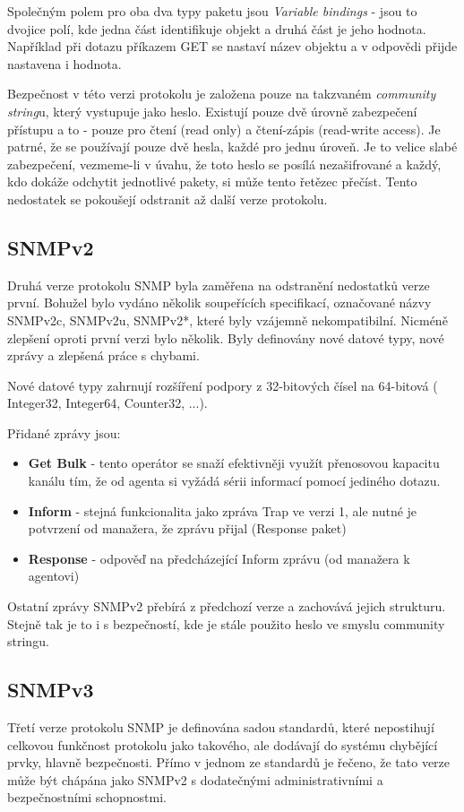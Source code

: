 Společným polem pro oba dva typy paketu jsou \textit{Variable bindings} - jsou to dvojice polí, kde jedna část identifikuje objekt a druhá část je jeho hodnota. Například
při dotazu příkazem GET se nastaví název objektu a v odpovědi přijde nastavena i hodnota.

Bezpečnost v této verzi protokolu je založena pouze na takzvaném \textit{community string}u, který vystupuje jako heslo. Existují pouze dvě úrovně zabezpečení
přístupu a to - pouze pro čtení (read only) a čtení-zápis (read-write access). Je patrné, že se používají pouze dvě hesla, každé pro jednu úroveň. Je to velice slabé
zabezpečení, vezmeme-li v úvahu, že toto heslo se posílá nezašifrované a každý, kdo dokáže odchytit jednotlivé pakety, si může tento řetězec přečíst. Tento nedostatek
se pokoušejí odstranit až další verze protokolu.

\subsection*{SNMPv2}
Druhá verze protokolu SNMP byla zaměřena na odstranění nedostatků verze první. Bohužel bylo vydáno několik soupeřících specifikací, označované názvy SNMPv2c, SNMPv2u, SNMPv2*, které
byly vzájemně nekompatibilní. Nicméně zlepšení oproti první verzi bylo několik. Byly definovány nové datové typy, nové zprávy a zlepšená práce s chybami.

Nové datové typy zahrnují rozšíření podpory z 32-bitových čísel na 64-bitová ( Integer32, Integer64, Counter32, ...). 

Přidané zprávy jsou:
\begin{itemize}
	\item \textbf{Get Bulk} - tento operátor se snaží efektivněji využít přenosovou kapacitu kanálu tím, že od agenta si vyžádá sérii informací pomocí jediného dotazu.
	\item \textbf{Inform} - stejná funkcionalita jako zpráva Trap ve verzi 1, ale nutné je potvrzení od manažera, že zprávu přijal (Response paket)
	\item \textbf{Response} - odpověď na předcházející Inform zprávu (od manažera k agentovi)
\end{itemize}

Ostatní zprávy SNMPv2 přebírá z předchozí verze a zachovává jejich strukturu. Stejně tak je to i s bezpečností, kde je stále použito heslo ve smyslu community stringu.

\subsection*{SNMPv3}
Třetí verze protokolu SNMP je definována sadou standardů, které nepostihují celkovou funkčnost protokolu jako takového, ale 
dodávají do systému chybějící prvky, hlavně bezpečnosti. Přímo v jednom ze standardů \cite{RFC2570} je řečeno, že tato verze může být chápána jako 
SNMPv2 s dodatečnými administrativními a bezpečnostními schopnostmi.


